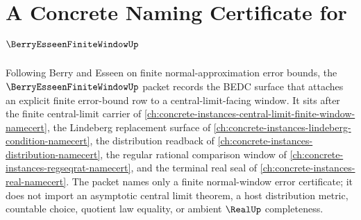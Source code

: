 \chapter{A Concrete Naming Certificate for $\BerryEsseenFiniteWindowUp$}
\label{ch:concrete-instances-berry-esseen-finite-window-namecert}

Following Berry and Esseen on finite normal-approximation error bounds, the $\BerryEsseenFiniteWindowUp$ packet records the BEDC surface that attaches an explicit finite error-bound row to a central-limit-facing window. It sits after the finite central-limit carrier of \autoref{ch:concrete-instances-central-limit-finite-window-namecert}, the Lindeberg replacement surface of \autoref{ch:concrete-instances-lindeberg-condition-namecert}, the distribution readback of \autoref{ch:concrete-instances-distribution-namecert}, the regular rational comparison window of \autoref{ch:concrete-instances-regseqrat-namecert}, and the terminal real seal of \autoref{ch:concrete-instances-real-namecert}. The packet names only a finite normal-window error certificate; it does not import an asymptotic central limit theorem, a host distribution metric, countable choice, quotient law equality, or ambient $\RealUp$ completeness.

